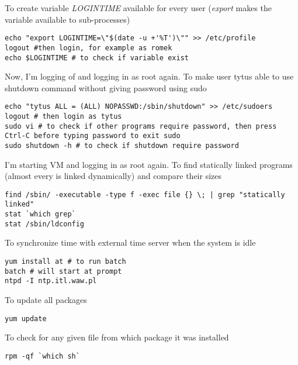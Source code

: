 \documentclass[a4paper,12pt]{article}
\begin{document}
    To create variable \emph{LOGINTIME} available for every user (\emph{export} makes the variable available to sub-processes)
    \begin{lstlisting}[frame=single]
echo "export LOGINTIME=\"$(date -u +'%T')\"" >> /etc/profile
logout #then login, for example as romek
echo $LOGINTIME # to check if variable exist
    \end{lstlisting}
    Now, I'm logging of and logging in as root again. To make user tytus able to use shutdown command without giving password using sudo 
    \begin{lstlisting}[frame=single]
echo "tytus ALL = (ALL) NOPASSWD:/sbin/shutdown" >> /etc/sudoers
logout # then login as tytus 
sudo vi # to check if other programs require password, then press Ctrl-C before typing password to exit sudo 
sudo shutdown -h # to check if shutdown require password
    \end{lstlisting}
    I'm starting VM and logging in as root again. To find statically linked programs (almost every is linked dynamically) and compare their sizes
    \begin{lstlisting}[frame=single]
find /sbin/ -executable -type f -exec file {} \; | grep "statically linked"
stat `which grep`
stat /sbin/ldconfig
    \end{lstlisting}
    To synchronize time with external time server when the system is idle
    \begin{lstlisting}[frame=single]
yum install at # to run batch
batch # will start at prompt 
ntpd -I ntp.itl.waw.pl
    \end{lstlisting}
    To update all packages
    \begin{lstlisting}[frame=single]
yum update
    \end{lstlisting}
    To check for any given file from which package it was installed
    \begin{lstlisting}[frame=single]
rpm -qf `which sh`
    \end{lstlisting}
\end{document}
